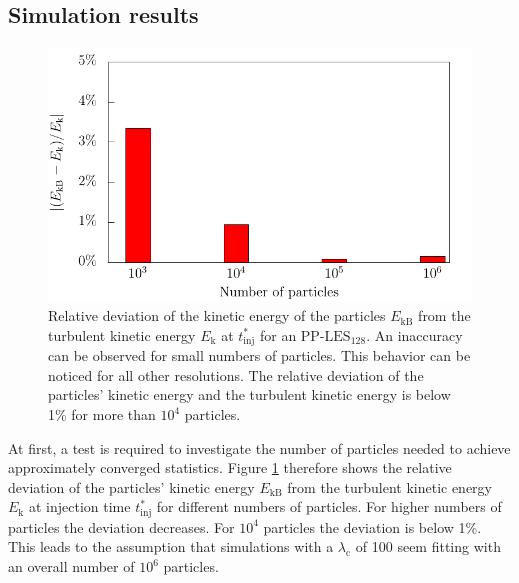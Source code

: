 \documentclass[11pt,a4paper,openany,oneside,parskip=half*]{article}
\begin{document}
\subsection{Simulation results}
\begin{figure}[h]
    \centering
    \begin{minipage}{0.5\textwidth}
        \centering
 	   \includegraphics[width=\linewidth]{./Abbildungen/kineticEnergy_numberOfParticles.pdf}
    \end{minipage}%
        \begin{minipage}{0.5\textwidth}
        \centering
        \caption{Relative deviation of the kinetic energy of the particles  $E_\mathrm{kB}$ from the turbulent kinetic energy $E_\mathrm{k}$ at $t^*_\mathrm{inj}$ for an PP-$\mathrm{LES_{128}}$. An inaccuracy can be observed for small numbers of particles. This behavior can be noticed for all other resolutions. The relative deviation of the particles' kinetic energy and the turbulent kinetic energy is below 1\% for more than $10^4$ particles.}
	\label{kineticEnergy_numberofparticles}
    \end{minipage}
    \end{figure}
At first, a test is required to investigate the number of particles needed to achieve approximately converged statistics.
Figure \ref{kineticEnergy_numberofparticles} therefore shows the relative deviation of the particles' kinetic energy $E_\mathrm{kB}$ from the turbulent kinetic energy $E_\mathrm{k}$ at injection time $t^*_\mathrm{inj}$ for different numbers of particles. For higher numbers of particles the deviation decreases. For $10^4$ particles the deviation is below 1\%.
This leads to the assumption that simulations with a $\lambda_\mathrm{c}$ of 100 seem fitting with an overall number of $10^6$ particles. 
\end{document}
